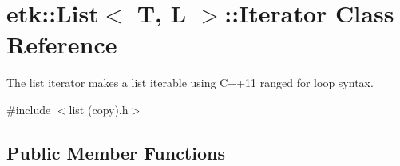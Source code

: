 \hypertarget{classetk_1_1_list_1_1_iterator}{\section{etk\-:\-:List$<$ T, L $>$\-:\-:Iterator Class Reference}
\label{classetk_1_1_list_1_1_iterator}
}


The list iterator makes a list iterable using C++11 ranged for loop syntax.  




{\ttfamily \#include $<$list (copy).\-h$>$}

\subsection*{Public Member Functions}
